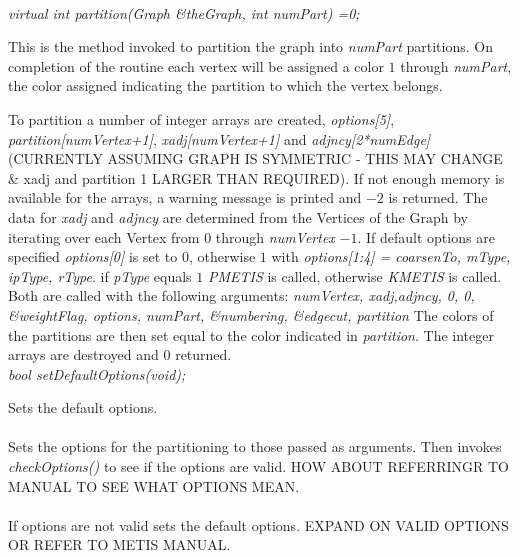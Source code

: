   \\
{\em virtual int partition(Graph \&theGraph, int numPart) =0;} 

This is the method invoked to partition the graph into {\em numPart}
partitions. On completion of the routine each vertex will be assigned
a color $1$ through {\em numPart}, the color assigned indicating the
partition to which the vertex belongs. 

To partition a number of integer arrays are created, {\em options[5]},
{\em partition[numVertex+1]}, {\em xadj[numVertex+1]} and {\em
adjncy[2*numEdge]} (CURRENTLY ASSUMING GRAPH IS SYMMETRIC - THIS MAY
CHANGE \& xadj and partition 1 LARGER THAN REQUIRED). If not enough
memory is available for the arrays, a warning message is printed and
$-2$ is returned. The data for {\em xadj} and {\em adjncy} are
determined from the Vertices of the Graph by iterating over each
Vertex from $0$ through {\em numVertex} $-1$. If default options are
specified {\em options[0]} is set to $0$, otherwise $1$ with {\em
options[1:4] = coarsenTo, mType, ipType, rType}. if {\em pType} equals
$1$ {\em PMETIS} is called, otherwise {\em KMETIS} is called. Both are
called with the following arguments: {\em numVertex, xadj,adjncy, 0,
0, \&weightFlag, options, numPart, \&numbering, \&edgecut, partition} 
The colors of the partitions are then set equal to the color indicated
in {\em partition}.  The integer arrays are destroyed and $0$
returned. \\

{\em bool setDefaultOptions(void);}

Sets the default options. \\

  \\ 
Sets the options for the partitioning to those passed as
arguments. Then invokes {\em checkOptions()} to see if the options are
valid. HOW ABOUT REFERRINGR TO MANUAL TO SEE WHAT OPTIONS MEAN. \\

  \\
If options are not valid sets the default options. EXPAND ON VALID
OPTIONS OR REFER TO METIS MANUAL. \\
